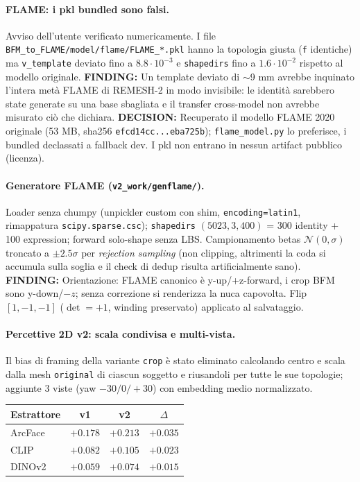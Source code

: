 \documentclass[11pt,a4paper]{article}
\newcommand{\finding}[1]{\textcolor{finding}{\textbf{FINDING:}} #1}
\newcommand{\decision}[1]{\textcolor{decision}{\textbf{DECISION:}} #1}
\begin{document}
\paragraph{FLAME: i pkl bundled sono falsi.} Avviso dell'utente verificato numericamente.
I file \texttt{BFM\_to\_FLAME/model/flame/FLAME\_*.pkl} hanno la topologia giusta
(\texttt{f} identiche) ma \texttt{v\_template} deviato fino a $8.8\cdot10^{-3}$ e
\texttt{shapedirs} fino a $1.6\cdot10^{-2}$ rispetto al modello originale.
\finding{Un template deviato di $\sim$9 mm avrebbe inquinato l'intera met\`a FLAME
di REMESH-2 in modo invisibile: le identit\`a sarebbero state generate su una base
sbagliata e il transfer cross-model non avrebbe misurato ci\`o che dichiara.}
\decision{Recuperato il modello FLAME 2020 originale (53 MB,
sha256 \texttt{efcd14cc...eba725b}); \texttt{flame\_model.py} lo preferisce, i bundled
declassati a fallback dev. I pkl non entrano in nessun artifact pubblico (licenza).}

\paragraph{Generatore FLAME (\texttt{v2\_work/genflame/}).} Loader senza chumpy
(unpickler custom con shim, \texttt{encoding=latin1}, rimappatura
\texttt{scipy.sparse.csc}); \texttt{shapedirs} $(5023,3,400)$ = 300 identity + 100
expression; forward solo-shape senza LBS. Campionamento betas $\mathcal{N}(0,\sigma)$
troncato a $\pm 2.5\sigma$ per \emph{rejection sampling} (non clipping, altrimenti la
coda si accumula sulla soglia e il check di dedup risulta artificialmente sano).
\finding{Orientazione: FLAME canonico \`e y-up/+z-forward, i crop BFM sono
y-down/$-z$; senza correzione si renderizza la nuca capovolta. Flip $[1,-1,-1]$
($\det=+1$, winding preservato) applicato al salvataggio.}

\paragraph{Percettive 2D v2: scala condivisa e multi-vista.} Il bias di framing
della variante \texttt{crop} \`e stato eliminato calcolando centro e scala dalla
mesh \texttt{original} di ciascun soggetto e riusandoli per tutte le sue topologie;
aggiunte 3 viste (yaw $-30/0/+30$) con embedding medio normalizzato.

\begin{center}
\begin{tabular}{lccc}
\toprule
Estrattore & v1 & v2 & $\Delta$ \\
\midrule
ArcFace & $+0.178$ & $+0.213$ & $+0.035$ \\
CLIP    & $+0.082$ & $+0.105$ & $+0.023$ \\
DINOv2  & $+0.059$ & $+0.074$ & $+0.015$ \\
\bottomrule
\end{tabular}
\end{center}
\end{document}
